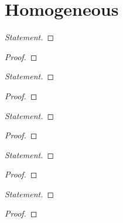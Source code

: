 
\section*{Homogeneous}


\begin{proof}[Statement]\renewcommand{\qedsymbol}{}

\end{proof}
\begin{proof}[Proof]\renewcommand{\qedsymbol}{}

\end{proof}


\begin{proof}[Statement]\renewcommand{\qedsymbol}{}

\end{proof}
\begin{proof}[Proof]\renewcommand{\qedsymbol}{}

\end{proof}


\begin{proof}[Statement]\renewcommand{\qedsymbol}{}

\end{proof}
\begin{proof}[Proof]\renewcommand{\qedsymbol}{}

\end{proof}


\begin{proof}[Statement]\renewcommand{\qedsymbol}{}

\end{proof}
\begin{proof}[Proof]\renewcommand{\qedsymbol}{}

\end{proof}


\begin{proof}[Statement]\renewcommand{\qedsymbol}{}

\end{proof}
\begin{proof}[Proof]\renewcommand{\qedsymbol}{}

\end{proof}

